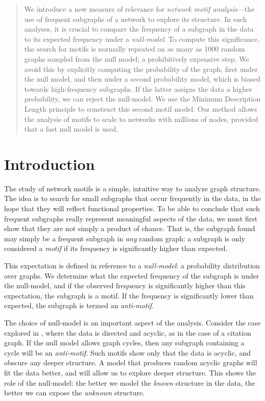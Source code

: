 
\begin{abstract}
\noindent We introduce a new measure of relevance for \emph{network motif analysis}---the use of frequent subgraphs of a network to explore its structure. In such analyses, it is crucial to compare the frequency of a subgraph in the data to its expected frequency under a \emph{null-model}. To compute this significance, the search for motifs is normally repeated on as many as 1000 random graphs sampled from the null model; a prohibitively expensive step. We avoid this by explicitly computing the probability of the graph, first under the null model, and then under a second probability model, which is biased towards high-frequency subgraphs. If the latter assigns the data a higher probability, we can reject the null-model. We use the Minimum Description Length principle to construct this second  motif model. Our method allows the analysis of motifs to scale to networks with millions of nodes, provided that a fast null model is used. 
\end{abstract}

\section{Introduction}

The study of network motifs \cite{milo2002network} is a simple, intuitive way to analyze graph structure. The idea is to search for small subgraphs that occur frequently in the data, in the hope that they will reflect functional properties. To be able to conclude that such frequent subgraphs really represent meaningful aspects of the data, we must first show that they are not simply a product of chance. That is, the subgraph found may simply be a frequent subgraph in \emph{any} random graph: a subgraph is only considered a \emph{motif} if its frequency is significantly higher than expected.

This expectation is defined in reference to a \emph{null-model}: a probability distribution over graphs. We determine what the expected frequency of the subgraph is under the null-model, and if the observed frequency is significantly higher than this expectation, the subgraph is a motif. If the frequency is significantly lower than expected, the subgraph is termed an \emph{anti-motif}.

The choice of null-model is an important aspect of the analysis. Consider the case explored in \cite{carstens2013motifs}, where the data is directed and acyclic, as in the case of a citation graph. If the null model allows graph cycles, then any subgraph containing a cycle will be an \emph{anti-motif}. Such motifs show only that the data is acyclic, and obscure any deeper structure. A model that produces random acyclic graphs will fit the data better, and will allow us to explore deeper structure. This shows the role of the null-model: the better we model the \emph{known} structure in the data, the better we can expose the \emph{unknown} structure. 

